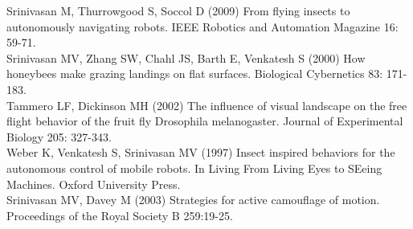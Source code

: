 \documentclass[12pt,letter]{article}
\begin{document}
Srinivasan M, Thurrowgood S, Soccol D (2009) From flying insects to autonomously navigating robots. IEEE Robotics and Automation Magazine  16: 59-71.\\

Srinivasan MV, Zhang SW, Chahl JS, Barth E, Venkatesh S (2000) How honeybees make grazing landings on flat surfaces. Biological Cybernetics  83: 171-183.\\

Tammero LF, Dickinson MH (2002) The influence of visual landscape on the free flight behavior of the fruit fly Drosophila melanogaster. Journal of Experimental Biology  205: 327-343.\\

Weber K, Venkatesh S, Srinivasan MV (1997) Insect inspired behaviors for the autonomous control of mobile robots. In Living From Living Eyes to SEeing Machines. Oxford University Press. \\


Srinivasan MV, Davey M (2003) Strategies for active camouflage of motion. Proceedings of the Royal Society B  259:19-25. \\
\end{document}

